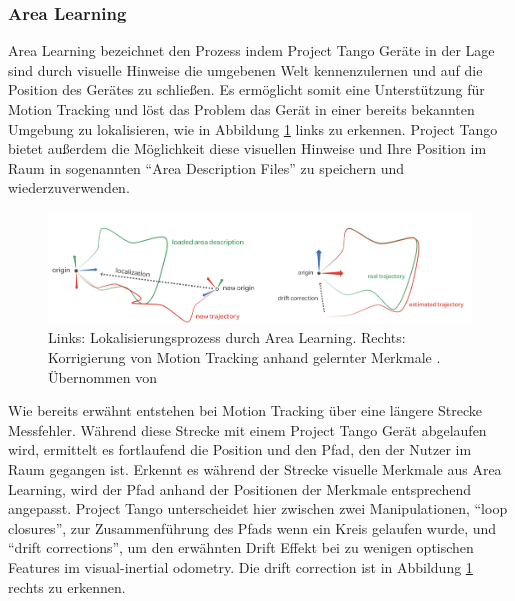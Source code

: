 \subsubsection{Area Learning} \label{subsec:area-learning}

Area Learning bezeichnet den Prozess indem Project Tango Geräte in der Lage sind durch visuelle Hinweise die umgebenen Welt kennenzulernen und auf die Position des Gerätes zu schließen. 
Es ermöglicht somit eine Unterstützung für Motion Tracking und löst das Problem das Gerät in einer bereits bekannten Umgebung zu lokalisieren, wie in Abbildung \ref{fig:area-learning} links zu erkennen.
Project Tango bietet außerdem die Möglichkeit diese visuellen Hinweise und Ihre Position im Raum in sogenannten \enquote{Area Description Files} zu speichern und wiederzuverwenden. \citep{GoogleDevelopersConcepts:online}

\begin{figure}[h]
  \centering
	\includegraphics[width=1.0\textwidth]{content/images/theory/tango-area-learning.png} 
  \caption{Links: Lokalisierungsprozess durch Area Learning. Rechts: Korrigierung von Motion Tracking anhand gelernter Merkmale . Übernommen von \citet{GoogleDevelopers:online}}
  \label{fig:area-learning}
\end{figure}

Wie bereits erwähnt entstehen bei Motion Tracking über eine längere Strecke Messfehler. 
Während diese Strecke mit einem Project Tango Gerät abgelaufen wird, ermittelt es fortlaufend die Position und den Pfad, den der Nutzer im Raum gegangen ist. 
Erkennt es während der Strecke visuelle Merkmale aus Area Learning, wird der Pfad anhand der Positionen der Merkmale entsprechend angepasst. 
Project Tango unterscheidet hier zwischen zwei Manipulationen, \enquote{loop closures}, zur Zusammenführung des Pfads wenn ein Kreis gelaufen wurde, und \enquote{drift corrections}, um den erwähnten Drift Effekt bei zu wenigen optischen Features im visual-inertial odometry. 
Die drift correction ist in Abbildung \ref{fig:area-learning} rechts zu erkennen. \citep{GoogleDevelopersConcepts:online} \\

